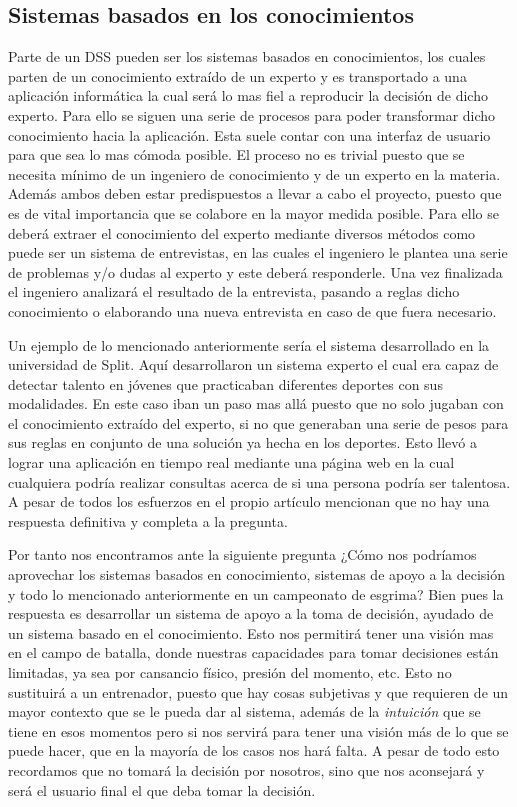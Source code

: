 \subsection{Sistemas basados en los conocimientos}

Parte de un DSS pueden ser los sistemas basados en conocimientos, los cuales parten de un conocimiento extraído de un
 experto y es transportado a una aplicación informática la cual será lo mas fiel a reproducir
 la decisión de dicho experto. Para ello se siguen una serie de procesos para poder transformar
 dicho conocimiento hacia la aplicación. Esta suele contar con una interfaz de usuario para que
 sea lo mas cómoda posible. El proceso no es trivial puesto que se necesita mínimo
 de un ingeniero de conocimiento y de un experto en la materia. Además ambos deben estar predispuestos
 a llevar a cabo el proyecto, puesto que es de vital importancia que se colabore en la mayor
 medida posible. Para ello se deberá extraer el conocimiento del experto mediante diversos métodos
 como puede ser un sistema de entrevistas, en las cuales el ingeniero le plantea una serie
 de problemas y/o dudas al experto y este deberá responderle. Una vez finalizada el ingeniero
 analizará el resultado de la entrevista, pasando a reglas dicho conocimiento o elaborando
 una nueva entrevista en caso de que fuera necesario.

Un ejemplo de lo mencionado anteriormente sería el sistema desarrollado en la universidad de Split.
 Aquí desarrollaron un sistema experto el cual era capaz de detectar talento en jóvenes que
 practicaban diferentes deportes con sus modalidades. En este caso iban un paso mas allá puesto
 que no solo jugaban con el conocimiento extraído del experto, si no que generaban una serie de
 pesos para sus reglas en conjunto de una solución ya hecha en los deportes. Esto llevó a lograr
 una aplicación en tiempo real mediante una página web en la cual cualquiera podría realizar consultas
 acerca de si una persona podría ser talentosa. A pesar de todos los esfuerzos en el propio artículo
 mencionan que no hay una respuesta definitiva y completa a la pregunta.

Por tanto nos encontramos ante la siguiente pregunta ¿Cómo nos podríamos aprovechar los
 sistemas basados en conocimiento, sistemas de apoyo a la decisión y todo lo mencionado
 anteriormente en un campeonato de esgrima? Bien pues la respuesta es desarrollar un sistema de apoyo
 a la toma de decisión, ayudado de un sistema basado en el conocimiento. Esto nos permitirá tener una
 visión mas en el campo de batalla, donde
 nuestras capacidades para tomar decisiones están limitadas, ya sea por cansancio físico, presión del
 momento, etc. Esto no sustituirá a un entrenador, puesto que hay cosas subjetivas y que requieren
 de un mayor contexto que se le pueda dar al sistema, además de la \textit{intuición} que se tiene en esos momentos
 pero si nos servirá para tener una visión más de lo que se puede hacer, que en la mayoría de los
 casos nos hará falta. A pesar de todo esto recordamos que no tomará la decisión por nosotros,
 sino que nos aconsejará y será el usuario final el que deba tomar la decisión.

